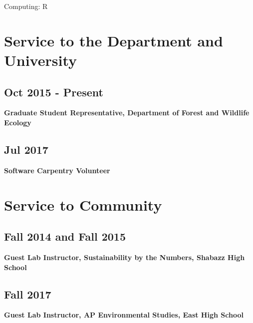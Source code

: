 \documentclass{article}
\begin{document}
Computing: R

\section*{Service to the Department and University}
\label{sec:orgc795fc0}
\subsection*{Oct 2015 - Present}
\label{sec:org940d568}
\textbf{Graduate Student Representative, Department of Forest and Wildlife
Ecology}
\subsection*{Jul 2017}
\label{sec:orge5a84c9}
\textbf{Software Carpentry Volunteer}
\section*{Service to Community}
\label{sec:org8e98aac}
\subsection*{Fall 2014 and Fall 2015}
\label{sec:org43cd048}
\textbf{Guest Lab Instructor, Sustainability by the Numbers, Shabazz High School}

\subsection*{Fall 2017}
\label{sec:orgdf0b56b}
\textbf{Guest Lab Instructor, AP Environmental Studies, East High School}
\end{document}
